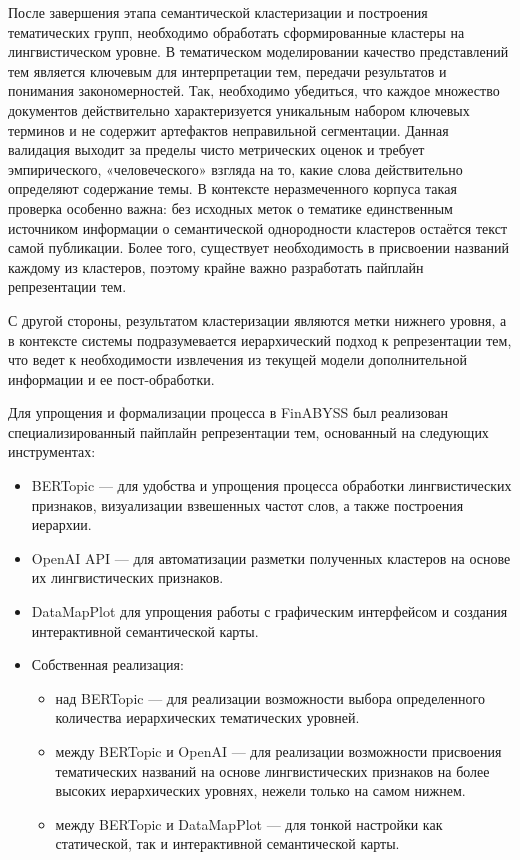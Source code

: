 После завершения этапа семантической кластеризации и построения тематических групп,
необходимо обработать сформированные кластеры на лингвистическом уровне. В тематическом
моделировании качество представлений тем является ключевым для интерпретации тем,
передачи результатов и понимания закономерностей. Так, необходимо убедиться,
что каждое множество документов действительно характеризуется уникальным набором
ключевых терминов и не содержит артефактов неправильной сегментации. Данная валидация
выходит за пределы чисто метрических оценок и требует эмпирического, «человеческого»
взгляда на то, какие слова действительно определяют содержание темы. В контексте
неразмеченного корпуса такая проверка особенно важна: без исходных меток о тематике
единственным источником информации о семантической однородности кластеров остаётся
текст самой публикации. Более того, существует необходимость в присвоении названий
каждому из кластеров, поэтому крайне важно разработать пайплайн репрезентации тем.

С другой стороны, результатом кластеризации являются метки нижнего уровня, а в контексте
системы подразумевается иерархический подход к репрезентации тем, что ведет к необходимости
извлечения из текущей модели дополнительной информации и ее пост-обработки.

Для упрощения и формализации процесса в FinABYSS был реализован специализированный пайплайн
репрезентации тем, основанный на следующих инструментах:





\begin{itemize}
    \item BERTopic --- для удобства и упрощения процесса обработки лингвистических признаков,
    визуализации взвешенных частот слов, а также построения иерархии.
    \item OpenAI API --- для автоматизации разметки полученных кластеров на основе их лингвистических признаков.
    \item DataMapPlot для упрощения работы с графическим интерфейсом и создания интерактивной семантической карты.
    \item Собственная реализация:
    \begin{itemize}
        \item над BERTopic --- для реализации возможности выбора определенного количества иерархических тематических уровней.
        \item между BERTopic и OpenAI --- для реализации возможности присвоения тематических названий на основе
        лингвистических признаков на более высоких иерархических уровнях, нежели только на самом нижнем.
        \item между BERTopic и DataMapPlot — для тонкой настройки как статической, так и интерактивной семантической карты.
    \end{itemize}
\end{itemize}

